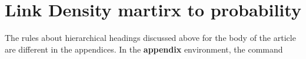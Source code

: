 \documentclass{sig-alternate-05-2015}
\begin{document}
\section{Link Density martirx to probability}
The rules about hierarchical headings discussed above for
the body of the article are different in the appendices.
In the \textbf{appendix} environment, the command
\end{document}

